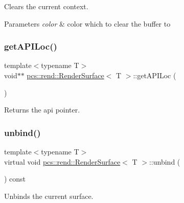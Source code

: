 Clears the current context. 


\begin{DoxyParams}{Parameters}
{\em color} & color which to clear the buffer to \\
\hline
\end{DoxyParams}
\mbox{\label{classpcs_1_1rend_1_1RenderSurface_a54cbf8c34638a82bfe02bc1f1663a4ab}} 
\subsubsection{\texorpdfstring{get\+A\+P\+I\+Loc()}{getAPILoc()}}
{\footnotesize\ttfamily template$<$typename T$>$ \\
void$\ast$$\ast$ \hyperlink{classpcs_1_1rend_1_1RenderSurface}{pcs\+::rend\+::\+Render\+Surface}$<$ T $>$\+::get\+A\+P\+I\+Loc (\begin{DoxyParamCaption}{ }\end{DoxyParamCaption})\hspace{0.3cm}{\ttfamily [inline]}}



Returns the api pointer. 

\mbox{\label{classpcs_1_1rend_1_1RenderSurface_aacb7218feb1973ee4b0486494fcd8c88}} 
\subsubsection{\texorpdfstring{unbind()}{unbind()}}
{\footnotesize\ttfamily template$<$typename T$>$ \\
virtual void \hyperlink{classpcs_1_1rend_1_1RenderSurface}{pcs\+::rend\+::\+Render\+Surface}$<$ T $>$\+::unbind (\begin{DoxyParamCaption}{ }\end{DoxyParamCaption}) const\hspace{0.3cm}{\ttfamily [pure virtual]}}



Unbinds the current surface. 



